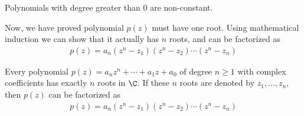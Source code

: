 \documentclass[thmcnt=section, color=cyan, 12pt]{my-elegantbook}
\begin{document}
\begin{proposition} \label{pro:1}
    Polynomials with degree greater than $0$ are non-constant.
\end{proposition}

Now, we have proved polynomial $p(z)$ must have one root. Using mathematical
induction we can show that it actually has $n$ roots, and can be factorized as
\begin{align*}
    p(z) = a_n (z^n - z_1) (z^n - z_2) \cdots (z^n - z_n)
\end{align*}

\begin{corollary}
    Every polynomial $p(z) = a_n z^n + \cdots + a_1 z + a_0$ of degree $n \geq 1$ with
    complex coefficients has exactly $n$ roots in $\C$. If these $n$ roots are
    denoted by $z_1, \ldots, z_n$, then $p(z)$ can be factorized as
    \begin{align*}
        p(z) = a_n (z^n - z_1) (z^n - z_2) \cdots (z^n - z_n)
    \end{align*}
\end{corollary}
\end{document}
